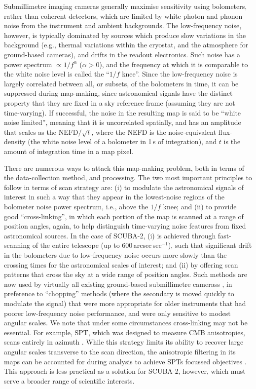 \documentclass[useAMS,usenatbib,nofootinbib]{mn2e}
\newcommand{\scuba}{SCUBA-2}
\begin{document}
Submillimetre imaging cameras generally maximise sensitivity using
bolometers, rather than coherent detectors, which are limited by white
photon and phonon noise from the instrument and ambient
backgrounds. The low-frequency noise, however, is typically dominated
by sources which produce slow variations in the background (e.g.,
thermal variations within the cryostat, and the atmosphere for
ground-based cameras), and drifts in the readout electronics. Such
noise has a power spectrum $\propto 1/f^\alpha$ ($\alpha>0$), and the
frequency at which it is comparable to the white noise level is called
the ``$1/f$ knee''. Since the low-frequency noise is largely
correlated between all, or subsets, of the bolometers in time, it can
be suppressed during map-making, since astronomical signals have the
distinct property that they are fixed in a sky reference frame
(assuming they are not time-varying). If successful, the noise in the
resulting map is said to be ``white noise limited'', meaning that it
is uncorrelated spatially, and has an amplitude that scales as the
$\mathrm{NEFD}/\sqrt{t}$, where the NEFD is the noise-equivalent
flux-density (the white noise level of a bolometer in 1\,s of
integration), and $t$ is the amount of integration time in a map
pixel.

There are numerous ways to attack this map-making problem, both in
terms of the data-collection method, and processing. The two most
important principles to follow in terms of scan strategy are: (i) to
modulate the astronomical signals of interest in such a way that they
appear in the lowest-noise regions of the bolometer noise power
spectrum, i.e., above the $1/f$ knee; and (ii) to provide good
``cross-linking'', in which each portion of the map is scanned at a
range of position angles, again, to help distinguish time-varying
noise features from fixed astronomical sources. In the case of \scuba,
(i) is achieved through fast-scanning of the entire telescope (up to
600\,arcsec\,sec$^{-1}$), such that significant drift in the
bolometers due to low-frequency noise occurs more slowly than the
crossing times for the astronomical scales of interest; and (ii) by
offering scan patterns that cross the sky at a wide range of position
angles. Such methods are now used by virtually all existing
ground-based submillimetre camerass
\citep[e.g.,][]{glenn1998,weferling2002,wilson2008,kovacs2008b}, in
preference to ``chopping'' methods (where the secondary is moved
quickly to modulate the signal) that were more appropriate for older
instruments that had poorer low-frequency noise performance, and were
only sensitive to modest angular scales. We note that under some
circumstances cross-linking may not be essential. For example, SPT,
which was designed to measure CMB anisotropies, scans entirely in
azimuth \citep{schaffer2011}. While this strategy limits its ability
to recover large angular scales transverse to the scan direction, the
anisotropic filtering in its maps can be accounted for during analysis
to achieve SPTs focussed objectives \citep[in contrast, the similar
ACT experiment uses cross-linking to improve its reponse to
large-angular scales,][]{das2011}. This approach is less practical as
a solution for \scuba, however, which must serve a broader range of
scientific interests.
\end{document}
